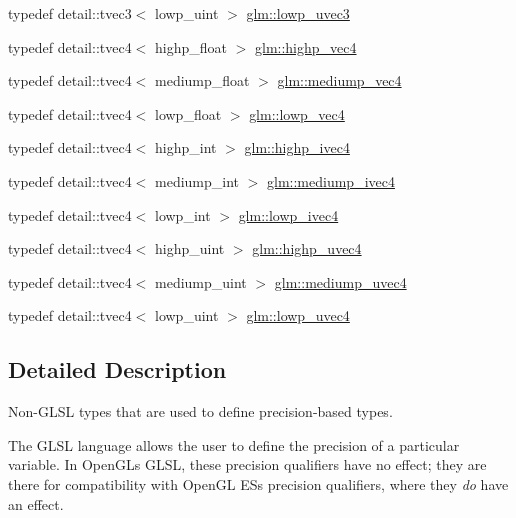 \begin{DoxyCompactItemize}
\item 
typedef detail\+::tvec3$<$ lowp\+\_\+uint $>$ \hyperlink{group__core__precision_ga45a3d9b09e9077ea280d8a1d599c7cae}{glm\+::lowp\+\_\+uvec3}
\item 
typedef detail\+::tvec4$<$ highp\+\_\+float $>$ \hyperlink{group__core__precision_ga78dab0bca921cd9a1e1206ee3cf01207}{glm\+::highp\+\_\+vec4}
\item 
typedef detail\+::tvec4$<$ mediump\+\_\+float $>$ \hyperlink{group__core__precision_ga592096fcf2ef1662f2c0dbbc7754e80c}{glm\+::mediump\+\_\+vec4}
\item 
typedef detail\+::tvec4$<$ lowp\+\_\+float $>$ \hyperlink{group__core__precision_gabc7a12b5fe2a8b5b4d11961c284637dc}{glm\+::lowp\+\_\+vec4}
\item 
typedef detail\+::tvec4$<$ highp\+\_\+int $>$ \hyperlink{group__core__precision_ga69b5a957eb1f6a1201cd7eb9a6ac04c5}{glm\+::highp\+\_\+ivec4}
\item 
typedef detail\+::tvec4$<$ mediump\+\_\+int $>$ \hyperlink{group__core__precision_gaabd2534479a6e7e493a7362b9f4c63cd}{glm\+::mediump\+\_\+ivec4}
\item 
typedef detail\+::tvec4$<$ lowp\+\_\+int $>$ \hyperlink{group__core__precision_gaf6a3d7f4b43a36e905511bc0753e3158}{glm\+::lowp\+\_\+ivec4}
\item 
typedef detail\+::tvec4$<$ highp\+\_\+uint $>$ \hyperlink{group__core__precision_gadc25684638be5d1caeb63d3d5e55feec}{glm\+::highp\+\_\+uvec4}
\item 
typedef detail\+::tvec4$<$ mediump\+\_\+uint $>$ \hyperlink{group__core__precision_ga50b1bc4e07de623f15ec5a319c85609f}{glm\+::mediump\+\_\+uvec4}
\item 
typedef detail\+::tvec4$<$ lowp\+\_\+uint $>$ \hyperlink{group__core__precision_gae312816bc8b9b803de46b9fb2da036eb}{glm\+::lowp\+\_\+uvec4}
\end{DoxyCompactItemize}


\subsection{Detailed Description}
Non-\/\+G\+L\+S\+L types that are used to define precision-\/based types. 

The G\+L\+S\+L language allows the user to define the precision of a particular variable. In Open\+G\+L\textquotesingle{}s G\+L\+S\+L, these precision qualifiers have no effect; they are there for compatibility with Open\+G\+L E\+S\textquotesingle{}s precision qualifiers, where they {\itshape do} have an effect.

